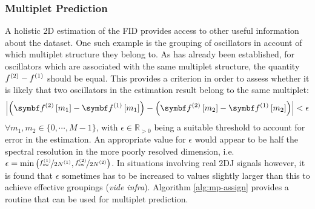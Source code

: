 \subsubsection{Multiplet Prediction}
A holistic \ac{2D} estimation of the \ac{FID} provides access to other useful
information about the dataset. One such example is the grouping of oscillators
in account of which multiplet structure they belong to. As has already been
established, for oscillators which are associated with the same multiplet
structure, the quantity $f^{(2)} - f^{(1)}$ should be equal. This provides a
criterion in order to assess whether it is likely that two oscillators in the
estimation result belong to the same multiplet:
\begin{equation}
    \left \lvert
        \left( \bdftwo \left[ m_1 \right] -
        \bdfone \left[ m_1 \right] \right) -
        \left( \bdftwo \left[ m_2 \right] -
        \bdfone \left[ m_2 \right] \right)
    \right \rvert < \epsilon
\end{equation}
$\forall m_1, m_2 \in \lbrace 0, \cdots, M-1 \rbrace$, with  $\epsilon \in
\mathbb{R}_{>0}$ being a suitable threshold to account for error in the
estimation. An appropriate value for $\epsilon$ would appear to be half the
spectral resolution in the more poorly resolved dimension, i.e.
$\epsilon = \min\left(\nicefrac{f_{\mathrm{sw}}^{(1)}}{2 N^{(1)}}, \nicefrac{f_{\mathrm{sw}}^{(2)}}{2N^{(2)}}\right)$. In situations involving real \ac{2DJ}
signals however, it is found that $\epsilon$ sometimes has to be increased to
values slightly larger than this to achieve effective groupings (\textit{vide
infra}). Algorithm \ref{alg:mp-assign} provides a routine that can be used for
multiplet prediction.


